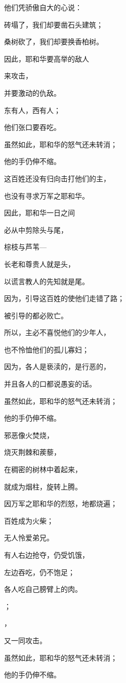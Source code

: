 {\par }{\Q 他们凭骄傲自大的心说：
\par }{\Q {}砖{}塌了，我们却要凿石头建筑；
\par }{\Q 桑树砍了，我们却要换香柏树。
\par }{\Q {}因此，耶和华要高举{}的敌人
\par }{\Q 来攻击{}，
\par }{\Q 并要激动{}的仇敌。
\par }{\Q {}东有{}人，西有{}人；
\par }{\Q 他们张口要吞吃{}。
\par }{\Q 虽然如此，耶和华的怒气还未转消；
\par }{\Q 他的手仍伸不缩。
\par }{\BB \par }{\Q {}这百姓还没有归向击打他们的主，
\par }{\Q 也没有寻求万军之耶和华。
\par }{\Q {}因此，耶和华一日之间
\par }{\Q 必从{}中剪除头与尾，
\par }{\Q 棕枝与芦苇—
\par }{\Q {}长老和尊贵人就是头，
\par }{\Q 以谎言教人的先知就是尾。
\par }{\Q {}因为，引导这百姓的使他们走错了路；
\par }{\Q 被引导的都必败亡。
\par }{\Q {}所以，主必不喜悦他们的少年人，
\par }{\Q 也不怜恤他们的孤儿寡妇；
\par }{\Q 因为，各人是亵渎的，是行恶的，
\par }{\Q 并且各人的口都说愚妄的话。
\par }{\Q 虽然如此，耶和华的怒气还未转消；
\par }{\Q 他的手仍伸不缩。
\par }{\BB \par }{\Q {}邪恶像火焚烧，
\par }{\Q 烧灭荆棘和蒺藜，
\par }{\Q 在稠密的树林中着起来，
\par }{\Q 就成为烟柱，旋转上腾。
\par }{\Q {}因万军之耶和华的烈怒，地都烧遍；
\par }{\Q 百姓成为火柴；
\par }{\Q 无人怜爱弟兄。
\par }{\Q {}有人右边抢夺，仍受饥饿，
\par }{\Q 左边吞吃，仍不饱足；
\par }{\Q 各人吃自己膀臂上的肉。
\par }{\Q {}；
\par }{，
\par }{\Q 又一同攻击{}。
\par }{\Q 虽然如此，耶和华的怒气还未转消；
\par }{\Q 他的手仍伸不缩。

}
